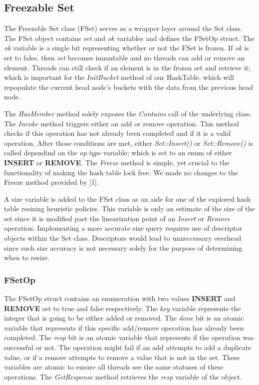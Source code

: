 \documentclass[11pt]{article} %
\begin{document}
\subsection{Freezable Set}

The Freezable Set class (FSet) serves as a wrapper layer around the Set class. The FSet object contains \textit{set} and \textit{ok} variables and defines the FSetOp struct. The \textit{ok} variable is a single bit representing whether or not the FSet is frozen. If \textit{ok} is set to false, then \textit{set} becomes immutable and no threads can add or remove an element. Threads can still check if an element is in the frozen set and retrieve it; which is important for the \textit{InitBucket} method of our HashTable, which will repopulate the current head node's buckets with the data from the previous head node.

The \textit{HasMember} method solely exposes the \textit{Contains} call of the underlying  class. The \textit{Invoke} method triggers either an add or remove operation. This method checks if this operation has not already been completed and if it is a valid operation. After those conditions are met, either \textit{Set::Insert()} or \textit{Set::Remove()} is called dependind on the \textit{op.type} variable; which is set to an enum of either \textbf{INSERT} or \textbf{REMOVE}. The \textit{Freeze} method is simple, yet crucial to the functionality of making the hash table lock free. We made no changes to the Freeze method provided by [1].

A size variable is added to the FSet class as an aide for one of the explored hash table resizing heuristic policies. This variable is only an estimate of the size of the set since it is modified past the linearization point of an \textit{Insert} or \textit{Remove} operation. Implementing a more accurate size query requires use of descriptor objects within the Set class. Descriptors would lead to unneccessary overhead since such size accuracy is not necessary solely for the purpose of determining when to resize.

\subsubsection{FSetOp}

The FSetOp struct contains an enumeration with two values \textbf{INSERT} and \textbf{REMOVE} set to true and false respectively. The \textit{key} variable represents the integer that is going to be either added or removed. The \textit{done} bit is an atomic variable that represents if this specific add/remove operation has already been completed. The \textit{resp} bit is an atomic variable that represents if the operation was successful or not. The operation might fail if an add attempts to add a duplicate value, or if a remove attempts to remove a value that is not in the set. These variables are atomic to ensure all threads see the same statuses of these operations. The \textit{GetResponse} method retrieves the \textit{resp} variable of the object.
\end{document}
